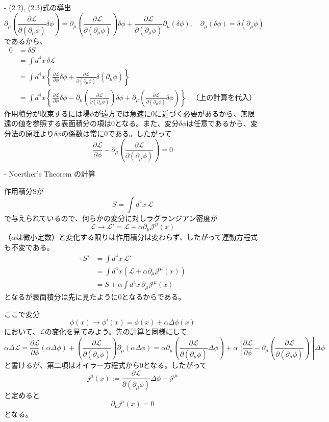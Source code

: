 \documentclass[a4paper]{ltjsarticle}
\begin{document}
- (2.2), (2.3)式の導出
\[
  \partial_\mu \left(\frac{\partial \mathcal{L}}{\partial(\partial_\mu \phi)} \delta \phi\right) = \partial_\mu \left(\frac{\partial \mathcal{L}}{\partial(\partial_\mu \phi)}\right) \delta \phi + \frac{\partial \mathcal{L}}{\partial(\partial_\mu \phi)} \partial_\mu (\delta \phi), \quad \partial_\mu (\delta \phi) = \delta(\partial_\mu \phi)
\]
であるから、
\begin{align*}
  0 & = \delta S \\
    & = \int d^4 x \, \delta \mathcal{L} \\
    & = \int d^4 x \left\{ \frac{\partial \mathcal{L}}{\partial \phi}\delta \phi + \frac{\partial \mathcal{L}}{\partial(\partial_\mu \phi)}\delta(\partial_\mu \phi) \right\} \\
    & = \int d^4 x \left\{ \frac{\partial \mathcal{L}}{\partial \phi}\delta \phi - \partial_\mu \left(\frac{\partial \mathcal{L}}{\partial(\partial_\mu \phi)}\right) \delta \phi + \partial_\mu \left(\frac{\partial \mathcal{L}}{\partial(\partial_\mu \phi)} \delta \phi\right) \right\} & \text{（上の計算を代入）}
\end{align*}
作用積分が収束するには場$\phi$が遠方では急速に0に近づく必要があるから、無限遠の値を参照する表面積分の項は0となる。また、変分$\delta \phi$は任意であるから、変分法の原理より$\delta \phi$の係数は常に0である。したがって
\[
  \frac{\partial \mathcal{L}}{\partial \phi} - \partial_\mu \left(\frac{\partial \mathcal{L}}{\partial(\partial_\mu \phi)}\right) = 0
\]

- Noerther's Theorem の計算

作用積分Sが
\[
  S = \int d^4 x \, \mathcal{L}
\]
で与えられているので、何らかの変分に対しラグランジアン密度が
\[
  \mathcal{L} \to \mathcal{L}' = \mathcal{L} + \alpha \partial_\mu \mathcal{J}^\mu (x)
\]
（$\alpha$は微小定数）と変化する限りは作用積分は変わらず、したがって運動方程式も不変である。
\begin{align*}
  \because S' & = \int d^4 x \, \mathcal{L}' \\
              & = \int d^4 x (\mathcal{L} + \alpha \partial_\mu \mathcal{J}^\mu (x)) \\
              & = S + \alpha \int d^4 x \, \partial_\mu \mathcal{J}^\mu (x)
\end{align*}
となるが表面積分は先に見たように0となるからである。

ここで変分
\[
  \phi(x) \to \phi'(x) = \phi(x) + \alpha \Delta \phi(x)
\]
において、$\mathcal{L}$の変化を見てみよう。先の計算と同様にして
\[
  \alpha \Delta \mathcal{L} = \frac{\partial \mathcal{L}}{\partial \phi} (\alpha \Delta \phi) + \left(\frac{\partial \mathcal{L}}{\partial(\partial_\mu \phi)}\right)\partial_\mu (\alpha \Delta \phi)
  = \alpha \partial_\mu \left(\frac{\partial \mathcal{L}}{\partial(\partial_\mu \phi)} \Delta \phi\right) + \alpha \left[\frac{\partial \mathcal{L}}{\partial \phi} - \partial_\mu \left(\frac{\partial \mathcal{L}}{\partial(\partial_\mu \phi)}\right)\right] \Delta \phi
\]
と書けるが、第二項はオイラー方程式から0となる。したがって
\[
  j^\mu (x) := \frac{\partial \mathcal{L}}{\partial(\partial_\mu \phi)} \Delta \phi - \mathcal{J}^\mu
\]
と定めると
\[
  \partial_\mu j^\mu (x) = 0
\]
となる。
\end{document}
